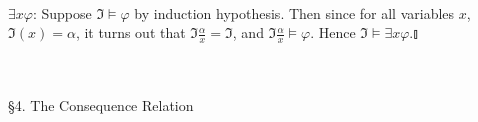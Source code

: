 \begin{enumerate}[1.]
\\$\exists x \varphi$: Suppose $\mathfrak{I} \models \varphi$ by induction hypothesis. Then since for all variables $x$, $\mathfrak{I}(x) = \alpha$, it turns out that $\mathfrak{I} \frac{\alpha}{x} = \mathfrak{I}$, and $\mathfrak{I} \frac{\alpha}{x} \models \varphi$. Hence $\mathfrak{I} \models \exists x \varphi$.\nolinebreak\hfill$\talloblong$
\end{enumerate}
\ 
\\
\\
{\large \S4. The Consequence Relation}
